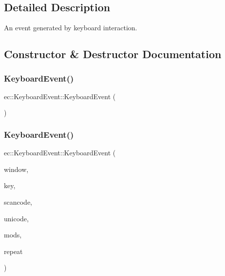 \subsection{Detailed Description}
An event generated by keyboard interaction. 

\subsection{Constructor \& Destructor Documentation}
\mbox{\label{structec_1_1_keyboard_event_a7bec67ef8aff46a11e0472a73e9b6916}} 
\subsubsection{\texorpdfstring{Keyboard\+Event()}{KeyboardEvent()}\hspace{0.1cm}{\footnotesize\ttfamily [1/2]}}
{\footnotesize\ttfamily ec\+::\+Keyboard\+Event\+::\+Keyboard\+Event (\begin{DoxyParamCaption}{ }\end{DoxyParamCaption})\hspace{0.3cm}{\ttfamily [explicit]}}

\mbox{\label{structec_1_1_keyboard_event_a2914ab97f4705f779d630a4c1dbcf4b6}} 
\subsubsection{\texorpdfstring{Keyboard\+Event()}{KeyboardEvent()}\hspace{0.1cm}{\footnotesize\ttfamily [2/2]}}
{\footnotesize\ttfamily ec\+::\+Keyboard\+Event\+::\+Keyboard\+Event (\begin{DoxyParamCaption}\item[{G\+L\+F\+Wwindow $\ast$}]{window,  }\item[{int}]{key,  }\item[{int}]{scancode,  }\item[{unsigned int}]{unicode,  }\item[{int}]{mods,  }\item[{bool}]{repeat }\end{DoxyParamCaption})\hspace{0.3cm}{\ttfamily [explicit]}}

